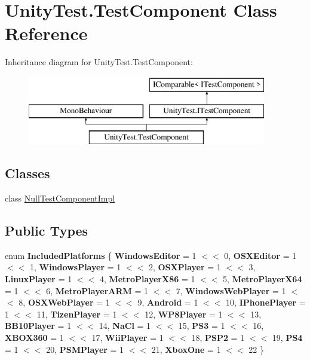 \hypertarget{class_unity_test_1_1_test_component}{}\section{Unity\+Test.\+Test\+Component Class Reference}
\label{class_unity_test_1_1_test_component}
Inheritance diagram for Unity\+Test.\+Test\+Component\+:\begin{figure}[H]
\begin{center}
\leavevmode
\includegraphics[height=3.000000cm]{class_unity_test_1_1_test_component}
\end{center}
\end{figure}
\subsection*{Classes}
\begin{DoxyCompactItemize}
\item 
class \hyperlink{class_unity_test_1_1_test_component_1_1_null_test_component_impl}{Null\+Test\+Component\+Impl}
\end{DoxyCompactItemize}
\subsection*{Public Types}
\begin{DoxyCompactItemize}
\item 
\mbox{\label{class_unity_test_1_1_test_component_aca32122824991eb31cbb75262b6060e3}} 
enum {\bfseries Included\+Platforms} \{ \newline
{\bfseries Windows\+Editor} = 1 $<$$<$ 0, 
{\bfseries O\+S\+X\+Editor} = 1 $<$$<$ 1, 
{\bfseries Windows\+Player} = 1 $<$$<$ 2, 
{\bfseries O\+S\+X\+Player} = 1 $<$$<$ 3, 
\newline
{\bfseries Linux\+Player} = 1 $<$$<$ 4, 
{\bfseries Metro\+Player\+X86} = 1 $<$$<$ 5, 
{\bfseries Metro\+Player\+X64} = 1 $<$$<$ 6, 
{\bfseries Metro\+Player\+A\+RM} = 1 $<$$<$ 7, 
\newline
{\bfseries Windows\+Web\+Player} = 1 $<$$<$ 8, 
{\bfseries O\+S\+X\+Web\+Player} = 1 $<$$<$ 9, 
{\bfseries Android} = 1 $<$$<$ 10, 
{\bfseries I\+Phone\+Player} = 1 $<$$<$ 11, 
\newline
{\bfseries Tizen\+Player} = 1 $<$$<$ 12, 
{\bfseries W\+P8\+Player} = 1 $<$$<$ 13, 
{\bfseries B\+B10\+Player} = 1 $<$$<$ 14, 
{\bfseries Na\+Cl} = 1 $<$$<$ 15, 
\newline
{\bfseries P\+S3} = 1 $<$$<$ 16, 
{\bfseries X\+B\+O\+X360} = 1 $<$$<$ 17, 
{\bfseries Wii\+Player} = 1 $<$$<$ 18, 
{\bfseries P\+S\+P2} = 1 $<$$<$ 19, 
\newline
{\bfseries P\+S4} = 1 $<$$<$ 20, 
{\bfseries P\+S\+M\+Player} = 1 $<$$<$ 21, 
{\bfseries Xbox\+One} = 1 $<$$<$ 22
 \}
\end{DoxyCompactItemize}
